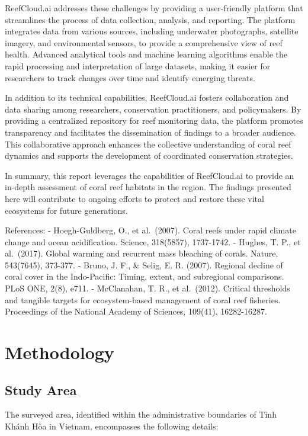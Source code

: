 \documentclass[
  letterpaper,
  DIV=11,
  numbers=noendperiod]{scrartcl}
\begin{document}
ReefCloud.ai addresses these challenges by providing a user-friendly
platform that streamlines the process of data collection, analysis, and
reporting. The platform integrates data from various sources, including
underwater photographs, satellite imagery, and environmental sensors, to
provide a comprehensive view of reef health. Advanced analytical tools
and machine learning algorithms enable the rapid processing and
interpretation of large datasets, making it easier for researchers to
track changes over time and identify emerging threats.

In addition to its technical capabilities, ReefCloud.ai fosters
collaboration and data sharing among researchers, conservation
practitioners, and policymakers. By providing a centralized repository
for reef monitoring data, the platform promotes transparency and
facilitates the dissemination of findings to a broader audience. This
collaborative approach enhances the collective understanding of coral
reef dynamics and supports the development of coordinated conservation
strategies.

In summary, this report leverages the capabilities of ReefCloud.ai to
provide an in-depth assessment of coral reef habitats in the region. The
findings presented here will contribute to ongoing efforts to protect
and restore these vital ecosystems for future generations.

References: - Hoegh-Guldberg, O., et al.~(2007). Coral reefs under rapid
climate change and ocean acidification. Science, 318(5857), 1737-1742. -
Hughes, T. P., et al.~(2017). Global warming and recurrent mass
bleaching of corals. Nature, 543(7645), 373-377. - Bruno, J. F., \&
Selig, E. R. (2007). Regional decline of coral cover in the
Indo-Pacific: Timing, extent, and subregional comparisons. PLoS ONE,
2(8), e711. - McClanahan, T. R., et al.~(2012). Critical thresholds and
tangible targets for ecosystem-based management of coral reef fisheries.
Proceedings of the National Academy of Sciences, 109(41), 16282-16287.

\section{Methodology}\label{methodology}

\subsection{Study Area}\label{study-area}

The surveyed area, identified within the administrative boundaries of
Tỉnh Khánh Hòa in Vietnam, encompasses the following details:
\end{document}

